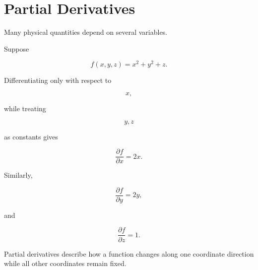 \section{Partial Derivatives}

Many physical quantities depend on several variables.

Suppose

\[
f(x,y,z)=x^2+y^2+z.
\]

Differentiating only with respect to

\[
x,
\]

while treating

\[
y,z
\]

as constants gives

\[
\boxed{
	\frac{\partial f}{\partial x}=2x.
}
\]

Similarly,

\[
\frac{\partial f}{\partial y}=2y,
\]

and

\[
\frac{\partial f}{\partial z}=1.
\]

Partial derivatives describe how a function changes along one coordinate
direction while all other coordinates remain fixed.

